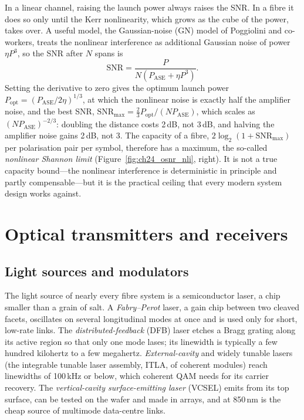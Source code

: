 \begin{keyidea}
In a linear channel, raising the launch power always raises the SNR. In a fibre it does so only until
the Kerr nonlinearity, which grows as the cube of the power, takes over. A useful model, the Gaussian-noise
(GN) model of Poggiolini and co-workers, treats the nonlinear interference as additional Gaussian noise
of power $\eta P^3$, so the SNR after $N$ spans is
\begin{equation}
\mathrm{SNR}=\frac{P}{N\left(P_{\mathrm{ASE}}+\eta P^3\right)}.
\label{eq:ch24:gn}
\end{equation}
Setting the derivative to zero gives the optimum launch power $P_{\mathrm{opt}}=(P_{\mathrm{ASE}}/2\eta)^{1/3}$,
at which the nonlinear noise is exactly half the amplifier noise, and the best SNR,
$\mathrm{SNR}_{\max}=\tfrac23P_{\mathrm{opt}}/(NP_{\mathrm{ASE}})$, which scales as $(NP_{\mathrm{ASE}})^{-2/3}$:
doubling the distance costs 2\,dB, not 3\,dB, and halving the amplifier noise gains 2\,dB, not 3. The
capacity of a fibre, $2\log_2(1+\mathrm{SNR}_{\max})$ per polarisation pair per symbol, therefore has a
maximum, the so-called \emph{nonlinear Shannon limit} (Figure~\ref{fig:ch24_osnr_nli}, right). It is not a
true capacity bound---the nonlinear interference is deterministic in principle and partly
compensable---but it is the practical ceiling that every modern system design works against.
\end{keyidea}

\section{Optical transmitters and receivers}
\label{sec:ch24:trx}

\subsection{Light sources and modulators}

The light source of nearly every fibre system is a semiconductor laser, a chip smaller than a grain
of salt. A \emph{Fabry--Perot} laser, a gain chip between two cleaved facets, oscillates on several
longitudinal modes at once and is used only for short, low-rate links. The \emph{distributed-feedback}
(DFB) laser etches a Bragg grating along its active region so that only one mode lases; its linewidth
is typically a few hundred kilohertz to a few megahertz. \emph{External-cavity} and widely tunable
lasers (the integrable tunable laser assembly, ITLA, of coherent modules) reach linewidths of 100\,kHz
or below, which coherent QAM needs for its carrier recovery. The \emph{vertical-cavity
surface-emitting laser} (VCSEL) emits from its top surface, can be tested on the wafer and made in
arrays, and at 850\,nm is the cheap source of multimode data-centre links.



